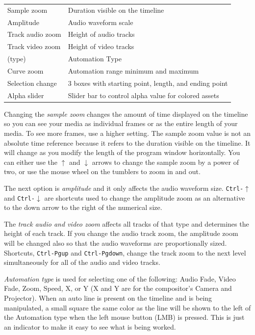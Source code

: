 \vspace{2ex}
\begin{tabular}{ll}
   \hline
	Sample zoom & Duration visible on the timeline \\
	Amplitude & Audio waveform scale \\
	Track audio zoom & Height of audio tracks \\
	Track video zoom & Height of video tracks \\
	  (type) & Automation Type \\
	Curve zoom & Automation range minimum and maximum \\
	Selection change & 3 boxes with starting point, length, and ending point \\
	Alpha slider & Slider bar to control alpha value for colored assets \\
   \hline
\end{tabular}

Changing the \emph{sample zoom} changes the amount of time displayed on the timeline 
so you can see your media as individual frames or as the entire length of your media. 
To see more frames, use a higher setting. 
The sample zoom value is not an absolute time reference because it refers to the duration visible on the timeline. It will change as you modify the length of the program window horizontally.
You can either use the $\uparrow$ and $\downarrow$ arrows to change the sample zoom by a power of two, or use the mouse wheel on the tumblers to zoom in and out.


The next option is \emph{amplitude} and it only affects the audio waveform  size. \texttt{Ctrl-$\uparrow$} and \texttt{Ctrl-$\downarrow$} are shortcuts used to change the amplitude zoom as an alternative to the down arrow to the right of the numerical size.

The \emph{track audio and video zoom} affects all tracks of that type and determines the height of each track. 
If you change the audio track zoom, the amplitude zoom will be changed also so that the audio waveforms
are proportionally sized.
Shortcuts, \texttt{Ctrl-Pgup} and \texttt{Ctrl-Pgdown}, change the track zoom to the next level simultaneously for all of the audio and video tracks.

\emph{Automation type}  is used for selecting one of the following: Audio Fade, Video Fade, Zoom, Speed, X, or Y (X and Y are for the compositor's Camera and Projector).  When an auto line is present on
the timeline and is being manipulated, a small square the same color as the line will be shown to 
the left of the Automation type when the left mouse button (LMB) is pressed.  This is just an indicator to make it easy to see what is being worked.
 

